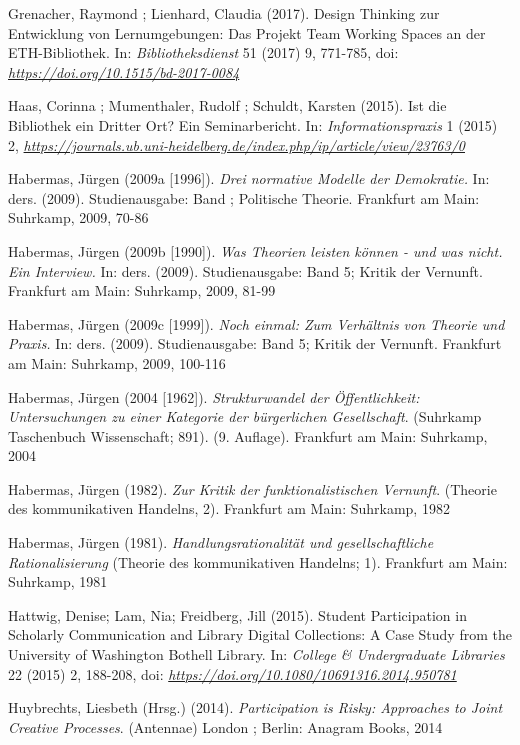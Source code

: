 \documentclass[a4paper,
fontsize=11pt,
oneside,
numbers=noperiodatend,
parskip=half-,
bibliography=totoc,
final
]{scrartcl}
\begin{document}
Grenacher, Raymond ; Lienhard, Claudia (2017). Design Thinking zur
Entwicklung von Lernumgebungen: Das Projekt Team Working Spaces an der
ETH-Bibliothek. In: \emph{Bibliotheksdienst} 51 (2017) 9, 771-785, doi:
\href{https://doi.org/10.1515/bd-2017-0084}{\emph{https://doi.org/10.1515/bd-2017-0084}}

Haas, Corinna ; Mumenthaler, Rudolf ; Schuldt, Karsten (2015). Ist die
Bibliothek ein Dritter Ort? Ein Seminarbericht. In:
\emph{Informationspraxis} 1 (2015) 2,
\href{https://journals.ub.uni-heidelberg.de/index.php/ip/article/view/23763/0}{\emph{https://journals.ub.uni-heidelberg.de/index.php/ip/article/view/23763/0}}

Habermas, Jürgen (2009a {[}1996{]}). \emph{Drei normative Modelle der
Demokratie.} In: ders. (2009). Studienausgabe: Band ; Politische
Theorie. Frankfurt am Main: Suhrkamp, 2009, 70-86

Habermas, Jürgen (2009b {[}1990{]}). \emph{Was Theorien leisten können -
und was nicht. Ein Interview.} In: ders. (2009). Studienausgabe: Band 5;
Kritik der Vernunft. Frankfurt am Main: Suhrkamp, 2009, 81-99

Habermas, Jürgen (2009c {[}1999{]}). \emph{Noch einmal: Zum Verhältnis
von Theorie und Praxis.} In: ders. (2009). Studienausgabe: Band 5;
Kritik der Vernunft. Frankfurt am Main: Suhrkamp, 2009, 100-116

Habermas, Jürgen (2004 {[}1962{]}). \emph{Strukturwandel der
Öffentlichkeit: Untersuchungen zu einer Kategorie der bürgerlichen
Gesellschaft}. (Suhrkamp Taschenbuch Wissenschaft; 891). (9. Auflage).
Frankfurt am Main: Suhrkamp, 2004

Habermas, Jürgen (1982). \emph{Zur Kritik der funktionalistischen
Vernunft}. (Theorie des kommunikativen Handelns, 2). Frankfurt am Main:
Suhrkamp, 1982

Habermas, Jürgen (1981). \emph{Handlungsrationalität und
gesellschaftliche Rationalisierung} (Theorie des kommunikativen
Handelns; 1). Frankfurt am Main: Suhrkamp, 1981

Hattwig, Denise; Lam, Nia; Freidberg, Jill (2015). Student Participation
in Scholarly Communication and Library Digital Collections: A Case Study
from the University of Washington Bothell Library. In: \emph{College \&
Undergraduate Libraries} 22 (2015) 2, 188-208, doi:
\href{http://dx.doi.org/10.1080/10691316.2014.950781}{\emph{https://doi.org/10.1080/10691316.2014.950781}}

Huybrechts, Liesbeth (Hrsg.) (2014). \emph{Participation is Risky:
Approaches to Joint Creative Processes}. (Antennae) London ; Berlin:
Anagram Books, 2014
\end{document}
